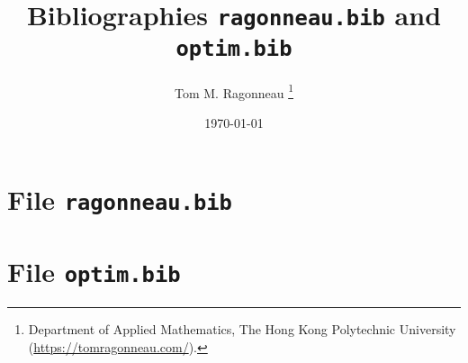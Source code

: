 \documentclass{article}
\title{Bibliographies \texttt{ragonneau.bib} and \texttt{optim.bib}}
\author{Tom M. Ragonneau%
    \thanks{%
        Department of Applied Mathematics,
        The Hong Kong Polytechnic University
        (\url{https://tomragonneau.com/}).
    }
}
\date{\today}
\begin{document}
    \maketitle

    \section{File \texttt{ragonneau.bib}}

    \begin{refsection}
        \nocite{*}
        \printbibliography[heading=none]
    \end{refsection}

    \section{File \texttt{optim.bib}}

    \begin{refsection}
        \nocite{*}
        \printbibliography[heading=none]
    \end{refsection}
\end{document}

